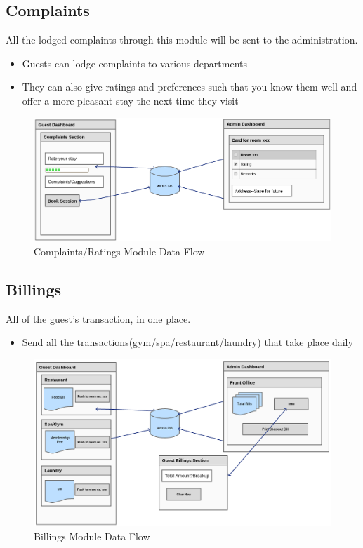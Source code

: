 \documentclass{scrreprt}
\begin{document}
\subsection{Complaints}
All the lodged complaints through this module will be sent to the administration.
\begin{itemize}
    \item Guests can lodge complaints to various departments
    \item They can also give ratings and preferences such that you know them well and offer a more pleasant stay the next time they visit
\end{itemize}
\begin{figure}
\includegraphics[scale=0.45]{ratings}
\caption{Complaints/Ratings Module Data Flow}
\end{figure}

\subsection{Billings}
All of the guest's transaction, in one place.
\begin{itemize}
    \item Send all the transactions(gym/spa/restaurant/laundry) that take place daily
\end{itemize}
\begin{figure}
\includegraphics[scale=0.45]{bills}
\caption{Billings Module Data Flow}
\end{figure}
\end{document}
